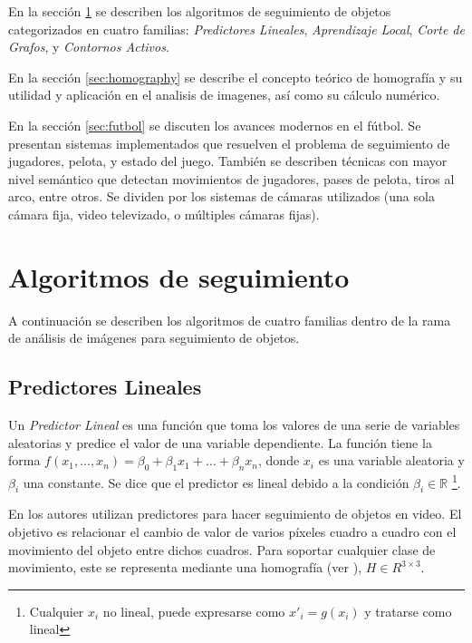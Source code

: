 \documentclass[a4paper,10pt]{article}
\begin{document}
En la sección \ref{sec:tracking} se describen los algoritmos de seguimiento
de objetos categorizados en cuatro familias:
\textit{Predictores Lineales},
\textit{Aprendizaje Local},
\textit{Corte de Grafos},
y \textit{Contornos Activos}.

En la sección \ref{sec:homography} se describe el concepto teórico de homografía y
su utilidad y aplicación en el analisis de imagenes, así como su cálculo numérico.

En la sección \ref{sec:futbol} se discuten los avances modernos en el fútbol.
Se presentan sistemas implementados que resuelven el problema de seguimiento de
jugadores, pelota, y estado del juego. También se describen técnicas con
mayor nivel semántico que detectan movimientos de jugadores, pases de pelota,
tiros al arco, entre otros. Se dividen por los
sistemas de cámaras utilizados (una sola cámara fija, video televizado, o
múltiples cámaras fijas).

\newpage

\section{Algoritmos de seguimiento}
\label{sec:tracking}

A continuación se describen los algoritmos de cuatro familias dentro de la rama
de análisis de imágenes para seguimiento de objetos.

\subsection{Predictores Lineales}

Un \textit{Predictor Lineal} es una función que toma los valores de una serie
de variables aleatorias y predice el valor de una variable dependiente.  La
función tiene la forma $f(x_1, ..., x_n) = \beta_0 + \beta_1 x_1 + \dots +
\beta_n x_n$, donde $x_i$ es una variable aleatoria y $\beta_i$ una constante.
Se dice que el predictor es lineal debido a la condición $\beta_i \in \mathbb{R}$
\footnote{Cualquier $x_i$ no lineal, puede expresarse como $x'_i = g(x_i)$ y tratarse como lineal}.

En \cite{alp, original-linear-predictors} los autores utilizan predictores para
hacer seguimiento de objetos en video.  El objetivo es relacionar el cambio de
valor de varios píxeles cuadro a cuadro con el movimiento del objeto entre
dichos cuadros.  Para soportar cualquier clase de movimiento, este se
representa mediante una homografía (ver \cite{homography-estimation}), $H \in
R^{3\times3}$.
\end{document}
